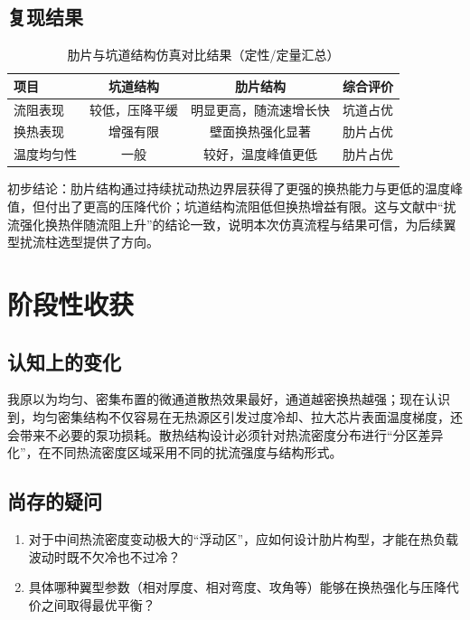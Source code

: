 \documentclass[stage1]{ydzjreport}
\begin{document}
\subsection{复现结果}

\begin{table}[htbp]
\centering
\caption{肋片与坑道结构仿真对比结果（定性/定量汇总）}
\begin{tabularx}{0.85\textwidth}{@{}Y c c c@{}}
\toprule
{} 项目 & 坑道结构 & 肋片结构 & 综合评价 \\
\midrule
流阻表现 & 较低，压降平缓 & 明显更高，随流速增长快 & 坑道占优 \\
换热表现 & 增强有限 & 壁面换热强化显著 & 肋片占优 \\
温度均匀性 & 一般 & 较好，温度峰值更低 & 肋片占优 \\
\bottomrule
\end{tabularx}
\end{table}

初步结论：肋片结构通过持续扰动热边界层获得了更强的换热能力与更低的温度峰值，但付出了更高的压降代价；坑道结构流阻低但换热增益有限。这与文献中“扰流强化换热伴随流阻上升”的结论一致，说明本次仿真流程与结果可信，为后续翼型扰流柱选型提供了方向。


\section{阶段性收获}

\subsection{认知上的变化}

我原以为均匀、密集布置的微通道散热效果最好，通道越密换热越强；现在认识到，均匀密集结构不仅容易在无热源区引发过度冷却、拉大芯片表面温度梯度，还会带来不必要的泵功损耗。散热结构设计必须针对热流密度分布进行“分区差异化”，在不同热流密度区域采用不同的扰流强度与结构形式。

\subsection{尚存的疑问}

\begin{enumerate}
  \item 对于中间热流密度变动极大的“浮动区”，应如何设计肋片构型，才能在热负载波动时既不欠冷也不过冷？
  \item 具体哪种翼型参数（相对厚度、相对弯度、攻角等）能够在换热强化与压降代价之间取得最优平衡？
\end{enumerate}
\end{document}
